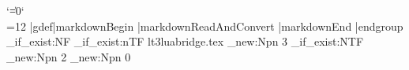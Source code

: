 \let\markdownMakeOther\relax
\let\markdownReadAndConvert\relax
\begingroup
  \catcode`\|=0\catcode`\\=12%
  |gdef|markdownBegin{%
    |markdownReadAndConvert{\markdownEnd}%
                           {|markdownEnd}}%
|endgroup
\ExplSyntaxOn
\cs_if_exist:NF
  \markdownMode
  {
    \file_if_exist:nTF
      { lt3luabridge.tex }
      {
        \cs_new:Npn
          \markdownMode
          { 3 }
      }
      {
        \cs_if_exist:NTF
          \directlua
          {
            \cs_new:Npn
              \markdownMode
              { 2 }
          }
          {
            \cs_new:Npn
              \markdownMode
              { 0 }
          }
      }
  }
\def\markdownLuaRegisterIBCallback#1{\relax}%
\def\markdownLuaUnregisterIBCallback#1{\relax}%
\ifx\markdownInfo\undefined
  \def\markdownInfo#1{%
    \immediate\write-1{(l.\the\inputlineno) markdown.tex info: #1.}}%
\fi
\ifx\markdownWarning\undefined
  \def\markdownWarning#1{%
    \immediate\write16{(l.\the\inputlineno) markdown.tex warning: #1}}%
\fi
\ifx\markdownError\undefined
  \def\markdownError#1#2{%
    \errhelp{#2.}%
    \errmessage{(l.\the\inputlineno) markdown.tex error: #1}}%
\fi
\def\markdownRendererInterblockSeparatorPrototype{\par}%
\def\markdownRendererLineBreakPrototype{\hfil\break}%
\let\markdownRendererEllipsisPrototype\dots
\def\markdownRendererNbspPrototype{~}%
\def\markdownRendererLeftBracePrototype{\char`\{}%
\def\markdownRendererRightBracePrototype{\char`\}}%
\def\markdownRendererDollarSignPrototype{\char`$}%
\def\markdownRendererPercentSignPrototype{\char`\%}%
\def\markdownRendererAmpersandPrototype{\&}%
\def\markdownRendererUnderscorePrototype{\char`_}%
\def\markdownRendererHashPrototype{\char`\#}%
\def\markdownRendererCircumflexPrototype{\char`^}%
\def\markdownRendererBackslashPrototype{\char`\\}%
\def\markdownRendererTildePrototype{\char`~}%
\def\markdownRendererPipePrototype{|}%
\def\markdownRendererCodeSpanPrototype#1{{\tt#1}}%
\def\markdownRendererLinkPrototype#1#2#3#4{#2}%
\def\markdownRendererContentBlockPrototype#1#2#3#4{%
  \markdownInput{#3}}%
\def\markdownRendererContentBlockOnlineImagePrototype{%
  \markdownRendererImage}%
\def\markdownRendererContentBlockCodePrototype#1#2#3#4#5{%
  \markdownRendererInputFencedCode{#3}{#2}}%
\def\markdownRendererImagePrototype#1#2#3#4{#2}%
\def\markdownRendererUlBeginPrototype{}%
\def\markdownRendererUlBeginTightPrototype{}%
\def\markdownRendererUlItemPrototype{}%
\def\markdownRendererUlItemEndPrototype{}%
\def\markdownRendererUlEndPrototype{}%
